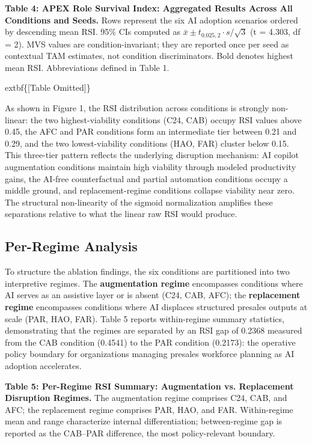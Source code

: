 \documentclass[10pt, conference]{IEEEtran}
\begin{document}
\textbf{Table 4: APEX Role Survival Index: Aggregated Results Across All Conditions and Seeds.} Rows represent the six AI adoption scenarios ordered by descending mean RSI. 95\% CIs computed as $\bar{x} \pm t_{0.025,2} \cdot s/\sqrt{3}$ (t = 4.303, df = 2). MVS values are condition-invariant; they are reported once per seed as contextual TAM estimates, not condition discriminators. Bold denotes highest mean RSI. Abbreviations defined in Table 1.

	extbf\{[Table Omitted]\}

As shown in Figure 1, the RSI distribution across conditions is strongly non-linear: the two highest-viability conditions (C24, CAB) occupy RSI values above 0.45, the AFC and PAR conditions form an intermediate tier between 0.21 and 0.29, and the two lowest-viability conditions (HAO, FAR) cluster below 0.15. This three-tier pattern reflects the underlying disruption mechanism: AI copilot augmentation conditions maintain high viability through modeled productivity gains, the AI-free counterfactual and partial automation conditions occupy a middle ground, and replacement-regime conditions collapse viability near zero. The structural non-linearity of the sigmoid normalization amplifies these separations relative to what the linear raw RSI would produce.



\subsection{Per-Regime Analysis}

\label{sec:per_regime_analysis}

To structure the ablation findings, the six conditions are partitioned into two interpretive regimes. The \textbf{augmentation regime} encompasses conditions where AI serves as an assistive layer or is absent (C24, CAB, AFC); the \textbf{replacement regime} encompasses conditions where AI displaces structured presales outputs at scale (PAR, HAO, FAR). Table 5 reports within-regime summary statistics, demonstrating that the regimes are separated by an RSI gap of 0.2368 measured from the CAB condition (0.4541) to the PAR condition (0.2173): the operative policy boundary for organizations managing presales workforce planning as AI adoption accelerates.

\textbf{Table 5: Per-Regime RSI Summary: Augmentation vs. Replacement Disruption Regimes.} The augmentation regime comprises C24, CAB, and AFC; the replacement regime comprises PAR, HAO, and FAR. Within-regime mean and range characterize internal differentiation; between-regime gap is reported as the CAB--PAR difference, the most policy-relevant boundary.
\end{document}
